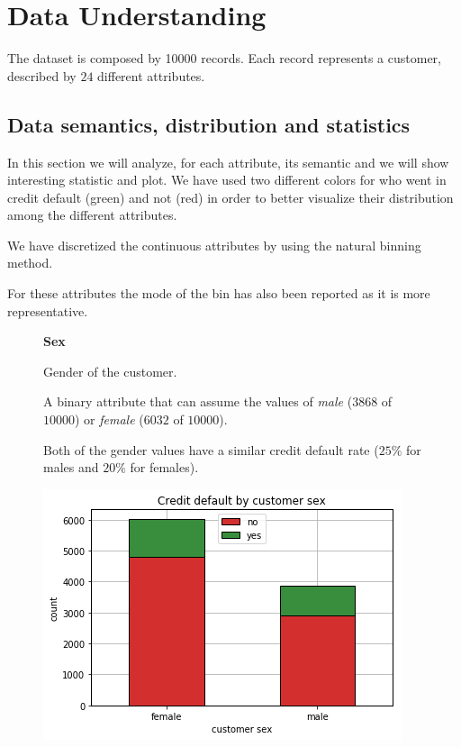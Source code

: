 \chapter{Data Understanding}

The dataset is composed by 10000 records. Each record represents a customer, described by $24$ different attributes.

\medskip

\section{Data semantics, distribution and statistics}

In this section we will analyze, for each attribute, its semantic and we will show interesting statistic and plot.
We have used two different colors for who went in credit default (green) and not (red) in order to better visualize their distribution among the different attributes.

We have discretized the continuous attributes by using the natural binning method. 

For these attributes the mode of the bin has also been reported as it is more representative.

\smallskip
\begin{figure}[h]
  \begin{minipage}[h]{.50\textwidth}
        {\Large \textbf{Sex}}
        
        Gender of the customer.
        
        A binary attribute that can assume the values of \textit{male} ($3868$ of $10000$) or \textit{female} ($6032$ of $10000$). 
        
        Both of the gender values have a similar credit default rate ($25\%$ for males and $20\%$ for females).
  \end{minipage}
  \begin{minipage}[h]{.50\textwidth}
    \includegraphics[width=.95\textwidth]{img/ch2/sex}
  \end{minipage}
\end{figure}

